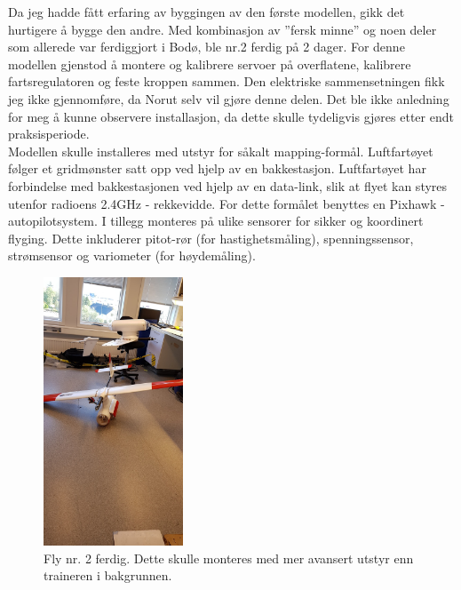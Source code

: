 \documentclass[12pt, a4paper]{article}
\begin{document}
Da jeg hadde fått erfaring av byggingen av den første modellen, gikk det hurtigere å bygge den andre. Med kombinasjon av ''fersk minne'' og noen deler som allerede var ferdiggjort i Bodø, ble nr.2 ferdig på 2 dager. For denne modellen gjenstod å montere og kalibrere servoer på overflatene, kalibrere fartsregulatoren og feste kroppen sammen. Den elektriske sammensetningen fikk jeg ikke gjennomføre, da Norut selv vil gjøre denne delen. Det ble ikke anledning for meg å kunne observere installasjon, da dette skulle tydeligvis gjøres etter endt praksisperiode. \\
Modellen skulle installeres med utstyr for såkalt mapping-formål. Luftfartøyet følger et gridmønster satt opp ved hjelp av en bakkestasjon. Luftfartøyet har forbindelse med bakkestasjonen ved hjelp av en data-link, slik at flyet kan styres utenfor radioens 2.4GHz - rekkevidde. For dette formålet benyttes en Pixhawk - autopilotsystem. I tillegg monteres på ulike sensorer for sikker og koordinert flyging. Dette inkluderer pitot-rør (for hastighetsmåling), spenningssensor, strømsensor og variometer (for høydemåling). 

\begin{figure}[h]
	\centering
	\includegraphics[width = .6\textwidth, height = 8cm]{bilder/andre_fly_ferdigstilt.jpg}
	\caption[Fly nummer to ferdig]{Fly nr. 2 ferdig. Dette skulle monteres med mer avansert utstyr enn traineren i bakgrunnen.}
\end{figure}
\end{document}

